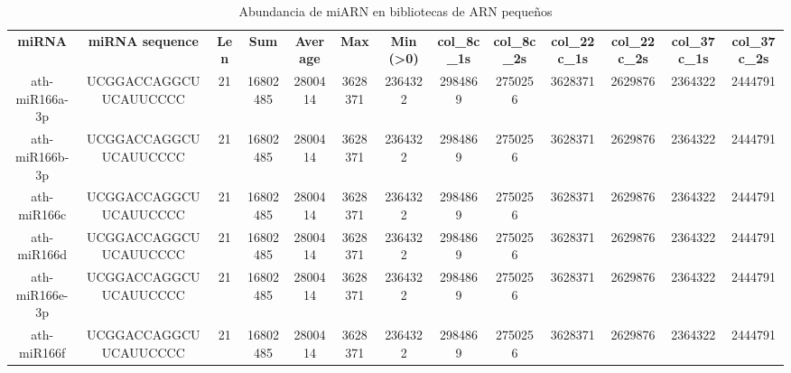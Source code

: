 \begin{landscape}
    \begin{table}[]
    \centering
    \tiny
    \caption{Abundancia de miARN en bibliotecas de ARN pequeños}
    \label{table:abundancia_miARN}
    \begin{tabular}{ccccccccccccc}
    \textbf{miRNA}   & \textbf{miRNA sequence}  & \textbf{Len} & \textbf{Sum} & \textbf{Average} & \textbf{Max} & \textbf{Min (\textgreater0)} & \textbf{col\_8c\_1s} & \textbf{col\_8c\_2s} & \textbf{col\_22c\_1s} & \textbf{col\_22c\_2s} & \textbf{col\_37c\_1s} & \textbf{col\_37c\_2s} \\
    ath-miR166a-3p   & UCGGACCAGGCUUCAUUCCCC    & 21           & 16802485     & 2800414          & 3628371      & 2364322                      & 2984869              & 2750256              & 3628371               & 2629876               & 2364322               & 2444791               \\
    ath-miR166b-3p   & UCGGACCAGGCUUCAUUCCCC    & 21           & 16802485     & 2800414          & 3628371      & 2364322                      & 2984869              & 2750256              & 3628371               & 2629876               & 2364322               & 2444791               \\
    ath-miR166c      & UCGGACCAGGCUUCAUUCCCC    & 21           & 16802485     & 2800414          & 3628371      & 2364322                      & 2984869              & 2750256              & 3628371               & 2629876               & 2364322               & 2444791               \\
    ath-miR166d      & UCGGACCAGGCUUCAUUCCCC    & 21           & 16802485     & 2800414          & 3628371      & 2364322                      & 2984869              & 2750256              & 3628371               & 2629876               & 2364322               & 2444791               \\
    ath-miR166e-3p   & UCGGACCAGGCUUCAUUCCCC    & 21           & 16802485     & 2800414          & 3628371      & 2364322                      & 2984869              & 2750256              & 3628371               & 2629876               & 2364322               & 2444791               \\
    ath-miR166f      & UCGGACCAGGCUUCAUUCCCC    & 21           & 16802485     & 2800414          & 3628371      & 2364322                      & 2984869              & 2750256              & 3628371               & 2629876               & 2364322               & 2444791               \\

\end{tabular}
\end{table}
\end{landscape}
